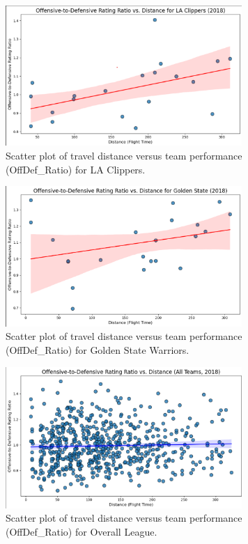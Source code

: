 \documentclass[12pt]{article}
\begin{document}
\begin{figure}[h!]
    \centering
    \includegraphics[width=0.8\textwidth]{Screenshot 2024-12-18 141637.png}
    \caption{Scatter plot of travel distance versus team performance (OffDef\_Ratio) for LA Clippers.}
    \label{fig:travel_performance_laclippers1}
\end{figure}
\begin{figure}[h!]
    \centering
    \includegraphics[width=0.8\textwidth]{Screenshot 2024-12-18 142937.png}
    \caption{Scatter plot of travel distance versus team performance (OffDef\_Ratio) for Golden State Warriors.}
    \label{fig:travel_performance_laclippers1}
\end{figure}

\begin{figure}[h!]
    \centering
    \includegraphics[width=0.8\textwidth]{Screenshot 2024-12-18 144058.png}
    \caption{Scatter plot of travel distance versus team performance (OffDef\_Ratio) for Overall League.}
    \label{fig:travel_performance_laclippers1}
\end{figure}
\end{document}
